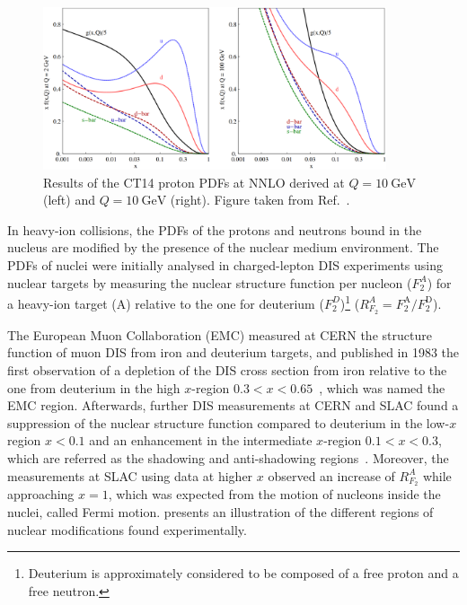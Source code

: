 \begin{figure}[!htb]
 \centering
 \includegraphics[width=0.9\textwidth]{Figures/WBoson/Theory/CT14NNLO.png}
 \caption{Results of the CT14 proton PDFs at NNLO derived at $Q = \SI{10}{\GeV}$ (left) and $Q = \SI{10}{\GeV}$ (right). Figure taken from Ref.~\cite{CT14}.}
 \label{fig:CT14}
\end{figure}

In heavy-ion collisions, the PDFs of the protons and neutrons bound in the nucleus are modified by the presence of the nuclear medium environment. The PDFs of nuclei were initially analysed in charged-lepton DIS experiments using nuclear targets by measuring the nuclear structure function per nucleon ($F^{A}_{2}$) for a heavy-ion target (A) relative to the one for deuterium ($F^{D}_{2}$)\footnote{Deuterium is approximately considered to be composed of a free proton and a free neutron.} ($R^{A}_{F_{2}} = F^{\text{A}}_{2}/F^{\text{D}}_{2}$). 

The European Muon Collaboration (EMC) measured at CERN the structure function of muon DIS from iron and deuterium targets, and published in 1983 the first observation of a depletion of the DIS cross section from iron relative to the one from deuterium in the high $x$-region $0.3 < x < 0.65$~\cite{EMCStrucFunc_1}, which was named the EMC region. Afterwards, further DIS measurements at CERN and SLAC found a suppression of the nuclear structure function compared to deuterium in the low-$x$ region $x < 0.1$ and an enhancement in the intermediate $x$-region $0.1 < x < 0.3$, which are referred as the shadowing and anti-shadowing regions~\cite{EMCStrucFunc_2}. Moreover, the measurements at SLAC using data at higher $x$ observed an increase of $R^{A}_{F_{2}}$ while approaching $x = 1$, which was expected from the motion of nucleons inside the nuclei, called Fermi motion.  presents an illustration of the different regions of nuclear modifications found experimentally.

